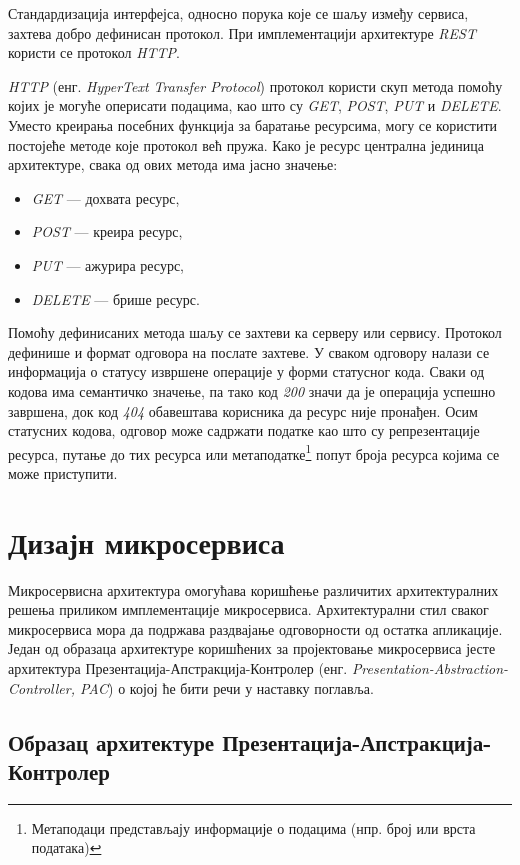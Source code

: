 \documentclass[12pt,oneside]{memoir}
\begin{document}
Стандардизација интерфејса, односно порука које се шаљу између сервиса, захтева добро дефинисан протокол. При имплементацији архитектуре \textit{REST} користи се протокол \textit{HTTP}.

\textit{HTTP} (енг. \textit{HyperText Transfer Protocol}) протокол користи скуп метода помоћу којих је могуће оперисати подацима, као што су \textit{GET}, \textit{POST}, \textit{PUT} и \textit{DELETE}.  Уместо креирања посебних функција за баратање ресурсима, могу се користити постојеће методе које протокол већ пружа. Како је ресурс централна јединица архитектуре, свака од ових метода има јасно значење: 
\begin{itemize}
\item \textit{GET} --- дохвата ресурс,
\item \textit{POST} --- креира ресурс,
\item \textit{PUT} --- ажурира ресурс,
\item \textit{DELETE} --- брише ресурс.
\end{itemize}

Помоћу дефинисаних метода шаљу се захтеви ка серверу или сервису. Протокол дефинише и формат одговора на послате захтеве. У сваком одговору налази се информација о статусу извршене операције у форми статусног кода. Сваки од кодова има семантичко значење, па тако код \textit{200} значи да је операција успешно завршена, док код \textit{404} обавештава корисника да ресурс није пронађен. Осим статусних кодова, одговор може садржати податке као што су репрезентације ресурса, путање до тих ресурса или метаподатке\footnote{Метаподаци представљају информације о подацима (нпр. број или врста података)} попут броја ресурса којима се може приступити.

\newpage
\section{Дизајн микросервиса}

Микросервисна архитектура омогућава коришћење различитих архитектуралних решења приликом имплементације микросервиса. Архитектурални стил сваког микросервиса мора да подржава раздвајање одговорности од остатка апликације. Један од образаца архитектуре коришћених за пројектовање микросервиса јесте архитектура Презентација-Апстракција-Контролер (енг.\textit{ Presentation-Abstraction-Controller, PAC}) о којој ће бити речи у наставку поглавља.

\subsection{Образац архитектуре Презентација-Апстракција-Контролер}
\end{document}
